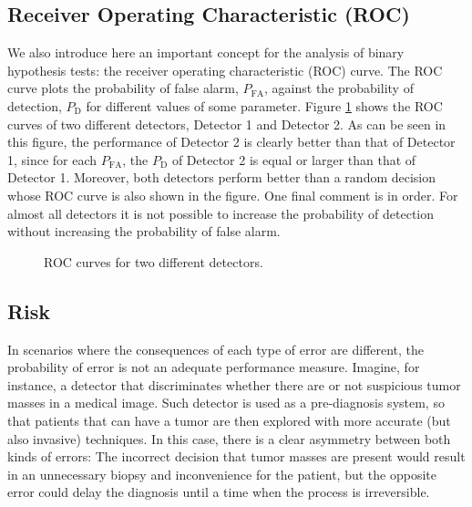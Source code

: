 \subsection{Receiver Operating Characteristic (ROC)}

We also introduce here an important concept for the analysis of binary hypothesis tests: the receiver operating characteristic (ROC) curve. The ROC curve plots the probability of false alarm, $P_\text{FA}$, against the probability of detection, $P_\text{D}$ for different values of some parameter. Figure \ref{fig:ROC} shows the ROC curves of two different detectors, Detector 1 and Detector 2. As can be seen in this figure, the performance of Detector 2 is clearly better than that of Detector 1, since for each $P_\text{FA}$, the $P_\text{D}$ of Detector 2 is equal or larger than that of Detector 1. Moreover, both detectors perform better than a random decision whose ROC curve is also shown in the figure. One final comment is in order. For almost all detectors it is not possible to increase the probability of detection without increasing the probability of false alarm.

\begin{figure}
\begin{center}

\end{center}
\caption{ROC curves for two different detectors.\label{fig:ROC}}
\end{figure}

\subsection{Risk}

In scenarios where the consequences of each type of error are different, the probability of error is not an adequate performance measure. Imagine, for instance, a detector that discriminates whether there are or not suspicious tumor masses in a medical image. Such detector is used as a pre-diagnosis system, so that patients that can have a tumor are then explored with more accurate (but also invasive) techniques. In this case, there is a clear asymmetry between both kinds of errors: The incorrect decision that tumor masses are present would result in an unnecessary biopsy and inconvenience for the patient, but the opposite error could delay the diagnosis until a time when the process is irreversible.

